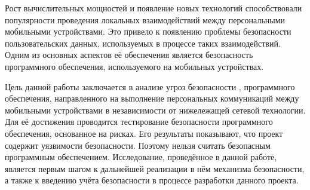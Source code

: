 %
Рост вычислительных мощностей и появление новых технологий способствовали популярности проведения локальных взаимодействий между персональными мобильными устройствами. 
%
Это привело к появлению проблемы безопасности пользовательских данных, используемых в процессе таких взаимодействий. 
%
Одним из основных аспектов её обеспечения является безопасность программного обеспечения, используемого на мобильных устройствах. 

%
Цель данной работы заключается в анализе угроз безопасности , программного обеспечения, направленного на выполнение персональных коммуникаций между мобильными устройствами в независимости от нижележащей сетевой технологии. 
%
Для её достижения проводится тестирование безопасности программного обеспечения, основанное на рисках. 
%
Его результаты показывают, что проект содержит уязвимости безопасности.
%
Поэтому  нельзя считать безопасным программным обеспечением. 
%
Исследование, проведённое в данной работе, является первым шагом к дальнейшей реализации в нём механизма безопасности, а также к введению учёта безопасности в процессе разработки данного проекта.

